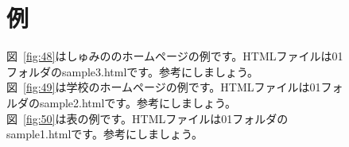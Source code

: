 \clearpage

\begin{figure}[h]
  \section{例}

  図{~\ref{fig:48}はしゅみののホームページの例です。HTMLファイルは01フォルダのsample3.htmlです。参考にしましょう。}\\
  図{~\ref{fig:49}は学校のホームページの例です。HTMLファイルは01フォルダのsample2.htmlです。参考にしましょう。}\\
  図{~\ref{fig:50}は表の例です。HTMLファイルは01フォルダのsample1.htmlです。参考にしましょう。}\\


\end{figure}
